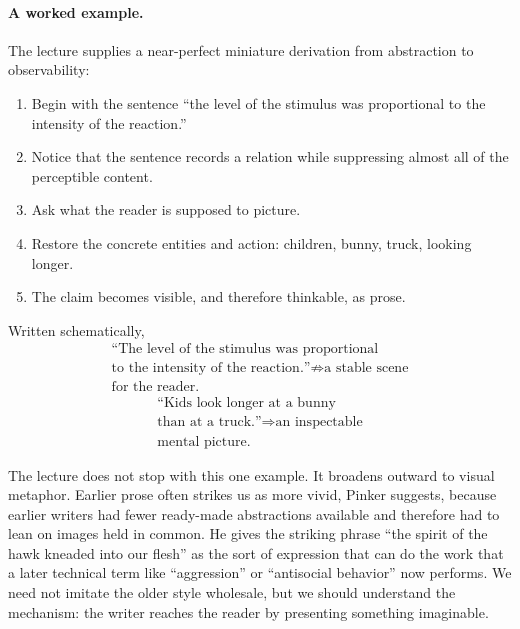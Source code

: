 \paragraph{A worked example.}
The lecture supplies a near-perfect miniature derivation from abstraction to observability:
\begin{enumerate}
\item Begin with the sentence ``the level of the stimulus was proportional to the intensity of the reaction.''
\item Notice that the sentence records a relation while suppressing almost all of the perceptible content.
\item Ask what the reader is supposed to picture.
\item Restore the concrete entities and action: children, bunny, truck, looking longer.
\item The claim becomes visible, and therefore thinkable, as prose.
\end{enumerate}

Written schematically,
\begin{equation}
\begin{gathered}
\text{``The level of the stimulus was proportional} \\
\text{to the intensity of the reaction.''}
\not\Rightarrow \text{a stable scene} \\
\text{for the reader.}
\end{gathered}
\end{equation}
\begin{equation}
\begin{gathered}
\text{``Kids look longer at a bunny} \\
\text{than at a truck.''}
\Rightarrow \text{an inspectable} \\
\text{mental picture.}
\end{gathered}
\end{equation}

The lecture does not stop with this one example. It broadens outward to visual metaphor. Earlier prose often strikes us as more vivid, Pinker suggests, because earlier writers had fewer ready-made abstractions available and therefore had to lean on images held in common. He gives the striking phrase ``the spirit of the hawk kneaded into our flesh'' as the sort of expression that can do the work that a later technical term like ``aggression'' or ``antisocial behavior'' now performs. We need not imitate the older style wholesale, but we should understand the mechanism: the writer reaches the reader by presenting something imaginable.

